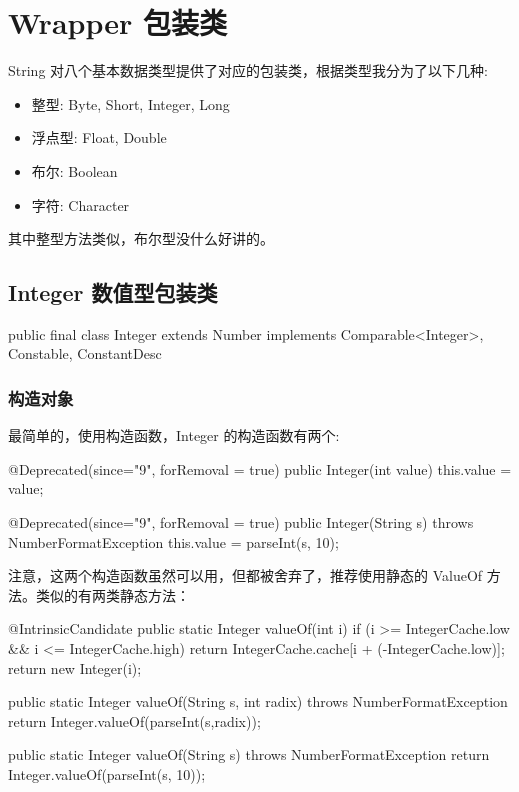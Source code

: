 \section{Wrapper 包装类}

String 对八个基本数据类型提供了对应的包装类，根据类型我分为了以下几种:

\begin{itemize}
    \item 整型: Byte, Short, Integer, Long
    \item 浮点型: Float, Double
    \item 布尔: Boolean
    \item 字符: Character
\end{itemize}

其中整型方法类似，布尔型没什么好讲的。

\subsection{Integer 数值型包装类}

\begin{Java}
public final class Integer extends Number 
    implements Comparable<Integer>, Constable, ConstantDesc {}
\end{Java}

\subsubsection{构造对象}

最简单的，使用构造函数，Integer 的构造函数有两个:

\begin{Java}
@Deprecated(since="9", forRemoval = true)
public Integer(int value) {
    this.value = value;
}

@Deprecated(since="9", forRemoval = true)
public Integer(String s) throws NumberFormatException {
    this.value = parseInt(s, 10);
}
\end{Java}

注意，这两个构造函数虽然可以用，但都被舍弃了，推荐使用静态的 ValueOf 方法。类似的有两类静态方法：

\begin{Java}
@IntrinsicCandidate
public static Integer valueOf(int i) {
    if (i >= IntegerCache.low && i <= IntegerCache.high)
        return IntegerCache.cache[i + (-IntegerCache.low)];
    return new Integer(i);
}

public static Integer valueOf(String s, int radix) throws NumberFormatException {
    return Integer.valueOf(parseInt(s,radix));
}

public static Integer valueOf(String s) throws NumberFormatException {
    return Integer.valueOf(parseInt(s, 10));
}
\end{Java}

